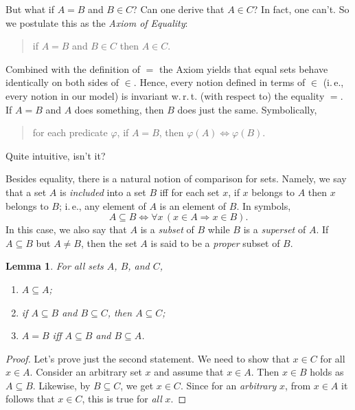 \documentclass[12pt,notitlepage]{article}
\theoremstyle{plain}
\newtheorem{lemma}[thm]{Lemma}
\theoremstyle{definition}
\theoremstyle{plain}
\newcommand{\sbs}{\subseteq}
\renewcommand{\phi}{\varphi}
\newcommand{\1}{\mathbf{1}}
\newcommand{\0}{\mathbf{0}}
\newcommand{\ply}{\Longrightarrow}
\newcommand{\mcomm}[1]{}
\begin{document}
But what if $A = B$ and $B \in C$? Can one derive that $A \in C$? In fact, one can't. So we postulate this as the \emph{Axiom of Equality}:
\begin{quote}
if $A = B$ and $B \in C$ then $A \in C$.
\end{quote}
Combined with the definition of ${=}$ the Axiom yields that equal sets behave identically on both sides of ${\in}$. Hence, every notion defined in terms of ${\in}$ (i.\,e., every notion in our model) is invariant w.\,r.\,t. (with respect to) the equality ${=}$. If $A = B$ and $A$ does something, then $B$ does just the same. Symbolically,
\begin{quote}
for each predicate $\phi$, if $A = B$, then $\phi(A) \iff \phi(B)$.
\end{quote}
Quite intuitive, isn't it? 

\mcomm{Clearly, one needs some form of induction over `predicates' (or, better, formulas) $\phi$ in order to prove this statement; some metatheory is thus needed. On the other hand, we can easily prove it for every \emph{particular} $\phi$ below. So, we have decided to believe it without a proof. }

Besides equality, there is a natural notion of comparison for sets. Namely, we say that a set $A$ is \emph{included} into a set $B$ iff for each set $x$, if $x$ belongs to $A$ then $x$ belongs to $B$; i.\,e., any element of $A$ is an element of $B$. In symbols,
$$A \sbs B \iff \forall x\, (x \in A \ply x \in B).$$
In this case, we also say that $A$ is a \emph{subset} of $B$ while $B$ is a \emph{superset} of $A$. If $A \sbs B$ but $A \neq B$, then the set $A$ is said to be a \emph{proper} subset of $B$.

\begin{lemma}\label{ch0:subset}
For all sets $A$, $B$, and $C$,
\begin{enumerate}
\item $A \sbs A$;
\item if $A \sbs B$ and $B \sbs C$, then $A \sbs C$;
\item $A = B$ iff $A \sbs B$ and $B \sbs A$.
\end{enumerate}
\end{lemma}
\begin{proof}
Let's prove just the second statement. We need to show that $x \in C$ for all $x \in A$. Consider an arbitrary set $x$ and assume that $x \in A$. Then $x \in B$ holds as $A \sbs B$. Likewise, by $B \sbs C$, we get $x \in C$. Since for an \emph{arbitrary} $x$, from $x \in A$ it follows that $x \in C$, this is true for \emph{all} $x$.
\end{proof}
\end{document}

